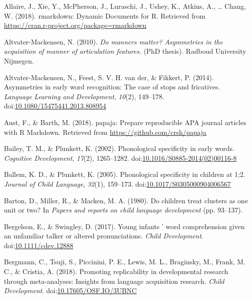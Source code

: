 \documentclass[man]{apa6}
\begin{document}
\begingroup
\setlength{\parindent}{-0.5in}
\setlength{\leftskip}{0.5in}

\hypertarget{refs}{}
\leavevmode\hypertarget{ref-RMarkdown}{}%
Allaire, J., Xie, Y., McPherson, J., Luraschi, J., Ushey, K., Atkins, A., \ldots{} Chang, W. (2018). rmarkdown: Dynamic Documents for R. Retrieved from \url{https://cran.r-project.org/package=rmarkdown}

\leavevmode\hypertarget{ref-Altvater2010}{}%
Altvater-Mackensen, N. (2010). \emph{Do manners matter? Asymmetries in the acquisition of manner of articulation features.} (PhD thesis). Radboud University Nijmegen.

\leavevmode\hypertarget{ref-Altvater2014}{}%
Altvater-Mackensen, N., Feest, S. V. H. van der, \& Fikkert, P. (2014). Asymmetries in early word recognition: The case of stops and fricatives. \emph{Language Learning and Development}, \emph{10}(2), 149--178. doi:\href{https://doi.org/10.1080/15475441.2013.808954}{10.1080/15475441.2013.808954}

\leavevmode\hypertarget{ref-papaja}{}%
Aust, F., \& Barth, M. (2018). papaja: Prepare reproducible APA journal articles with R Markdown. Retrieved from \url{https://github.com/crsh/papaja}

\leavevmode\hypertarget{ref-Bailey2002}{}%
Bailey, T. M., \& Plunkett, K. (2002). Phonological specificity in early words. \emph{Cognitive Development}, \emph{17}(2), 1265--1282. doi:\href{https://doi.org/10.1016/S0885-2014(02)00116-8}{10.1016/S0885-2014(02)00116-8}

\leavevmode\hypertarget{ref-Ballem2005}{}%
Ballem, K. D., \& Plunkett, K. (2005). Phonological specificity in children at 1;2. \emph{Journal of Child Language}, \emph{32}(1), 159--173. doi:\href{https://doi.org/10.1017/S0305000904006567}{10.1017/S0305000904006567}

\leavevmode\hypertarget{ref-Barton1980}{}%
Barton, D., Miller, R., \& Macken, M. A. (1980). Do children treat clusters as one unit or two? In \emph{Papers and reports on child language development} (pp. 93--137).

\leavevmode\hypertarget{ref-Bergelson2017}{}%
Bergelson, E., \& Swingley, D. (2017). Young infants ' word comprehension given an unfamiliar talker or altered pronunciations. \emph{Child Development}. doi:\href{https://doi.org/10.1111/cdev.12888}{10.1111/cdev.12888}

\leavevmode\hypertarget{ref-Bergmann2018}{}%
Bergmann, C., Tsuji, S., Piccinini, P. E., Lewis, M. L., Braginsky, M., Frank, M. C., \& Cristia, A. (2018). Promoting replicability in developmental research through meta-analyses: Insights from language acquisition research. \emph{Child Development}. doi:\href{https://doi.org/10.17605/OSF.IO/3UBNC}{10.17605/OSF.IO/3UBNC}
\end{document}
